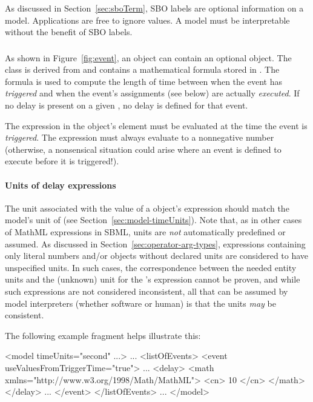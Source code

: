 As discussed in Section~\ref{sec:sboTerm}, SBO labels are optional
information on a model.  Applications are free to ignore
 values.  A model must be interpretable without the
benefit of SBO labels.


\subsubsection{}
\label{sec:event-delay}

As shown in Figure~\ref{fig:event}, an \Event object can contain
an optional \Delay object.  The \Delay class is derived from
\SBase and contains a mathematical formula stored in .
The formula is used to compute the length of time between when the
event has \emph{triggered} and when the event's assignments (see
below) are actually \emph{executed}.  If no delay is present on a
given \Event, no delay is defined for that event.

The expression in the \Delay object's  element must be
evaluated at the time the event is \emph{triggered}.  The expression
must always evaluate to a nonnegative number (otherwise, a
nonsensical situation could arise where an event is defined to
execute before it is triggered!).


\paragraph{Units of delay expressions}

The unit associated with the value of a \Delay object's
 expression should match the model's unit of
 (see Section~\ref{sec:model-timeUnits}).  Note
that, as in other cases of MathML expressions in SBML, units are
\emph{not} automatically predefined or assumed.  As discussed in
Section~\ref{sec:operator-arg-types}, expressions containing only
literal numbers and/or \Parameter objects without declared units
are considered to have unspecified units.  In such cases, the
correspondence between the needed entity units and the (unknown)
unit for the \Delay's  expression cannot be proven,
and while such expressions are not considered inconsistent, all
that can be assumed by model interpreters (whether software or
human) is that the units \emph{may} be consistent.

The following \Event example fragment helps illustrate this:
\label{sec:event:delay:example}

\vspace*{0.5ex}
\begin{example}
<model timeUnits="second" ...>
    ...
    <listOfEvents>
        <event useValuesFromTriggerTime="true">
            ...
            <delay>
                <math xmlns="http://www.w3.org/1998/Math/MathML">
                    <cn> 10 </cn>
                </math>
            </delay>
            ...
        </event>
    </listOfEvents>
    ...
</model>
\end{example}
\vspace*{0.5ex}

